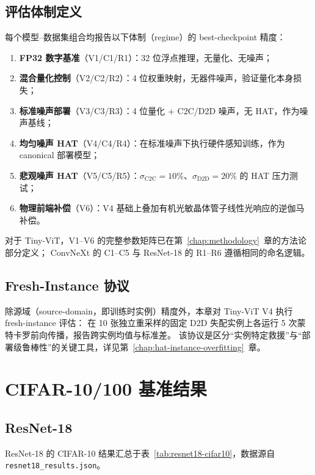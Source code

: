 \subsection{评估体制定义}

每个模型--数据集组合均报告以下体制（regime）的 best-checkpoint 精度：
\begin{enumerate}
    \item \textbf{FP32 数字基准}（V1/C1/R1）：32 位浮点推理，无量化、无噪声；
    \item \textbf{混合量化控制}（V2/C2/R2）：4 位权重映射，无器件噪声，验证量化本身损失；
    \item \textbf{标准噪声部署}（V3/C3/R3）：4 位量化 + C2C/D2D 噪声，无 HAT，作为噪声基线；
    \item \textbf{均匀噪声 HAT}（V4/C4/R4）：在标准噪声下执行硬件感知训练，作为 canonical 部署模型；
    \item \textbf{悲观噪声 HAT}（V5/C5/R5）：$\sigma_{\mathrm{C2C}}=10\%$、$\sigma_{\mathrm{D2D}}=20\%$ 的 HAT 压力测试；
    \item \textbf{物理前端补偿}（V6）：V4 基础上叠加有机光敏晶体管子线性光响应的逆伽马补偿。
\end{enumerate}

对于 Tiny-ViT，V1--V6 的完整参数矩阵已在第~\ref{chap:methodology}~章的方法论部分定义；
ConvNeXt 的 C1--C5 与 ResNet-18 的 R1--R6 遵循相同的命名逻辑。

\subsection{Fresh-Instance 协议}

除源域（source-domain，即训练时实例）精度外，本章对 Tiny-ViT V4 执行 fresh-instance 评估：
在 10 张独立重采样的固定 D2D 失配实例上各运行 5 次蒙特卡罗前向传播，报告跨实例均值与标准差。
该协议是区分``实例特定救援''与``部署级鲁棒性''的关键工具，详见第~\ref{chap:hat-instance-overfitting}~章。

\section{CIFAR-10/100 基准结果}

\subsection{ResNet-18}

ResNet-18 的 CIFAR-10 结果汇总于表~\ref{tab:resnet18-cifar10}，数据源自 \texttt{resnet18\_results.json}。

